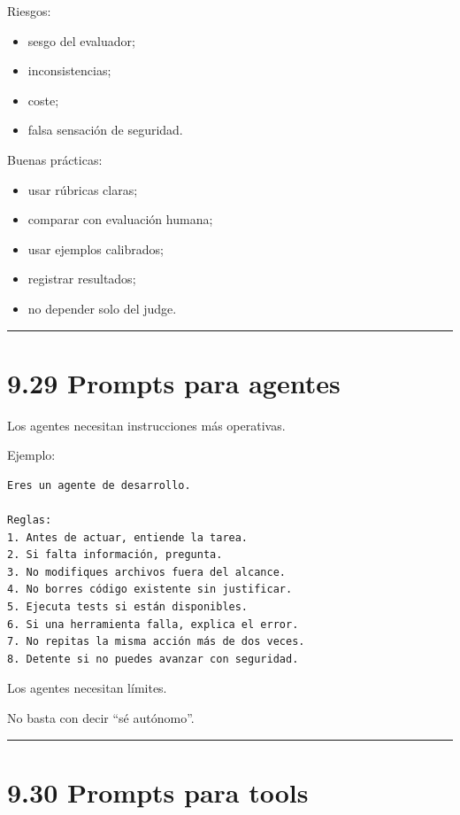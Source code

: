 Riesgos:

\begin{itemize}
\tightlist
\item
  sesgo del evaluador;
\item
  inconsistencias;
\item
  coste;
\item
  falsa sensación de seguridad.
\end{itemize}

Buenas prácticas:

\begin{itemize}
\tightlist
\item
  usar rúbricas claras;
\item
  comparar con evaluación humana;
\item
  usar ejemplos calibrados;
\item
  registrar resultados;
\item
  no depender solo del judge.
\end{itemize}

\begin{center}\rule{0.5\linewidth}{0.5pt}\end{center}

\section{9.29 Prompts para agentes}\label{prompts-para-agentes}

Los agentes necesitan instrucciones más operativas.

Ejemplo:

\begin{lstlisting}
Eres un agente de desarrollo.

Reglas:
1. Antes de actuar, entiende la tarea.
2. Si falta información, pregunta.
3. No modifiques archivos fuera del alcance.
4. No borres código existente sin justificar.
5. Ejecuta tests si están disponibles.
6. Si una herramienta falla, explica el error.
7. No repitas la misma acción más de dos veces.
8. Detente si no puedes avanzar con seguridad.
\end{lstlisting}

Los agentes necesitan límites.

No basta con decir ``sé autónomo''.

\begin{center}\rule{0.5\linewidth}{0.5pt}\end{center}

\section{9.30 Prompts para tools}\label{prompts-para-tools}

